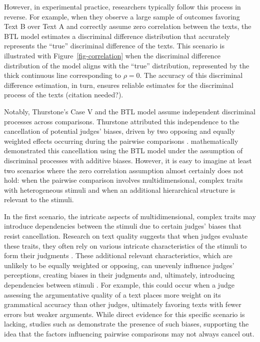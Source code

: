 \documentclass[
  authoryear,
  preprint,
  1p]{elsarticle}
\begin{document}
However, in experimental practice, researchers typically follow this
process in reverse. For example, when they observe a large sample of
outcomes favoring Text B over Text A and correctly assume zero
correlation between the texts, the BTL model estimates a discriminal
difference distribution that accurately represents the ``true''
discriminal difference of the texts. This scenario is illustrated with
Figure~\ref{fig-correlation} when the discriminal difference
distribution of the model aligns with the ``true'' distribution,
represented by the thick continuous line corresponding to \(\rho=0\).
The accuracy of this discriminal difference estimation, in turn, ensures
reliable estimates for the discriminal process of the texts (citation
needed?).

Notably, Thurstone's Case V and the BTL model assume independent
discriminal processes across comparisons. Thurstone attributed this
independence to the cancellation of potential judges' biases, driven by
two opposing and equally weighted effects occurring during the pairwise
comparisons \citep[pp.~268]{Thurstone_1927b}. \citet{Andrich_1978}
mathematically demonstrated this cancellation using the BTL model under
the assumption of discriminal processes with additive biases. However,
it is easy to imagine at least two scenarios where the zero correlation
assumption almost certainly does not hold: when the pairwise comparison
involves multidimensional, complex traits with heterogeneous stimuli and
when an additional hierarchical structure is relevant to the stimuli.

In the first scenario, the intricate aspects of multidimensional,
complex traits may introduce dependencies between the stimuli due to
certain judges' biases that resist cancellation. Research on text
quality suggests that when judges evaluate these traits, they often rely
on various intricate characteristics of the stimuli to form their
judgments
\citep{vanDaal_et_al_2016, Lesterhuis_2018, Chambers_et_al_2022}. These
additional relevant characteristics, which are unlikely to be equally
weighted or opposing, can unevenly influence judges' perceptions,
creating biases in their judgments and, ultimately, introducing
dependencies between stimuli
\citep[pp.~346]{vanderLinden_et_al_2017_II}. For example, this could
occur when a judge assessing the argumentative quality of a text places
more weight on its grammatical accuracy than other judges, ultimately
favoring texts with fewer errors but weaker arguments. While direct
evidence for this specific scenario is lacking, studies such as
\citet{Pollitt_et_al_2003} demonstrate the presence of such biases,
supporting the idea that the factors influencing pairwise comparisons
may not always cancel out.
\end{document}
